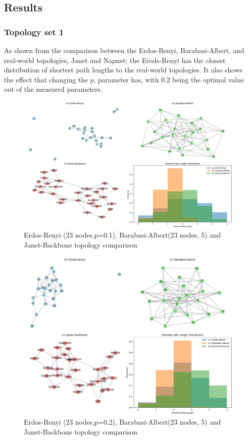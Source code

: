 

\subsection{Results}


\subsubsection{Topology set 1}
As shown from the comparison between the Erdos-Renyi, Barabasi-Albert, and real-world topologies, Janet and Napnet; the Erods-Renyi has the closest distribution of shortest path lengths to the real-world topologies. It also shows the effect that changing the $p$, parameter has, with 0.2 being the optimal value out of the measured parameters. 

\begin{figure}
    \centering
    \includegraphics[width=0.7\linewidth]{images/final-topo-comparison/1_1.png}
    \caption{Erdos-Renyi (23 nodes,p=0.1), Barabasi-Albert(23 nodes, 5) and Janet-Backbone topology comparison}
    \label{fig:1_1_comparison}
\end{figure}

\begin{figure}
    \centering
    \includegraphics[width=0.7\linewidth]{images/final-topo-comparison/2_1.png}
    \caption{Erdos-Renyi (23 nodes,p=0.2), Barabasi-Albert(23 nodes, 5) and Janet-Backbone topology comparison}
    \label{fig:2_1_comparison}
\end{figure}

